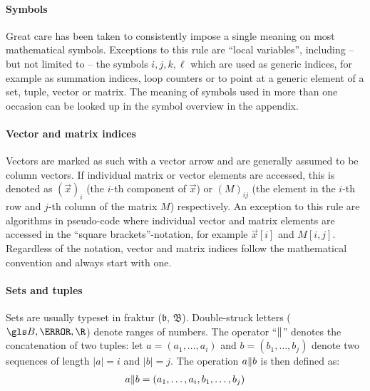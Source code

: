 \paragraph{Symbols}
Great care has been taken to consistently impose a single meaning on most mathematical symbols. Exceptions to this rule are \enquote{local variables}, including -- but not limited to -- the symbols $i, j, k, \ell$ which are used as generic indices, for example as summation indices, loop counters or to point at a generic element of a set, tuple, vector or matrix. The meaning of symbols used in more than one occasion can be looked up in the symbol overview in the appendix.

\paragraph{Vector and matrix indices}
Vectors are marked as such with a vector arrow and are generally assumed to be column vectors. If individual matrix or vector elements are accessed, this is denoted as $(\vec x)_i$ (the $i$-th component of $\vec x$) or $(M)_{ij}$ (the element in the $i$-th row and $j$-th column of the matrix $M$) respectively. An exception to this rule are algorithms in pseudo-code where individual vector and matrix elements are accessed in the \enquote{square brackets}-notation, for example $\vec x[i]$ and $M[i, j]$. Regardless of the notation, vector and matrix indices follow the mathematical convention and always start with one.

\paragraph{Sets and tuples}
Sets are usually typeset in fraktur (\eg $\mathfrak{b}$, $\mathfrak{B}$). Double-struck letters (\eg $\B, \N, \R$) denote ranges of numbers. The operator \enquote{$\Arrowvert$} denotes the concatenation of two tuples: let $a = (a_1, \ldots, a_i)$ and $b = (b_1, \ldots, b_j)$ denote two sequences of length $|a| = i$ and $|b| = j$. The operation $a \Arrowvert b$ is then defined as:
\begin{align}
	a \Arrowvert b = (a_1, \ldots, a_i, b_1, \ldots, b_j)
\end{align}

